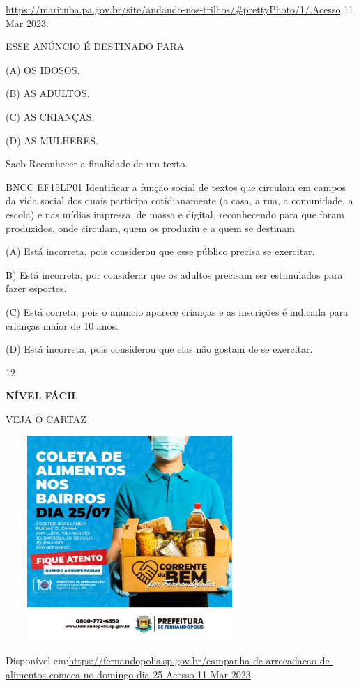 {{\url{https://marituba.pa.gov.br/site/andando-nos-trilhos/\#prettyPhoto/1/.Acesso}
11 Mar 2023.

ESSE ANÚNCIO É DESTINADO PARA

(A) OS IDOSOS.

(B) AS ADULTOS.

(C) AS CRIANÇAS.

(D) AS MULHERES.

Saeb Reconhecer a finalidade de um texto.

BNCC EF15LP01 Identificar a função social de textos que circulam em
campos da vida social dos quais participa cotidianamente (a casa, a rua,
a comunidade, a escola) e nas mídias impressa, de massa e digital,
reconhecendo para que foram produzidos, onde circulam, quem os produziu
e a quem se destinam

(A) Está incorreta, pois considerou que esse público precisa se
exercitar.

B) Está incorreta, por considerar que os adultos precisam ser
estimulados para fazer esportes.

(C) Está correta, pois o anuncio aparece crianças e as inscrições é
indicada para crianças maior de 10 anos.

(D) Está incorreta, pois considerou que elas não gostam de se exercitar.

\num{12}

\textbf{NÍVEL FÁCIL}

VEJA O CARTAZ

\includegraphics[width=3.71207in,height=3.06667in]{media/image171.jpeg}

Disponível
em:\href{https://fernandopolis.sp.gov.br/campanha-de-arrecadacao-de-alimentos-comeca-no-domingo-dia-25-Acesso\%2011\%20Mar\%202023}{https://fernandopolis.sp.gov.br/campanha-de-arrecadacao-de-alimentos-comeca-no-domingo-dia-25-Acesso
11 Mar 2023}.

}}
